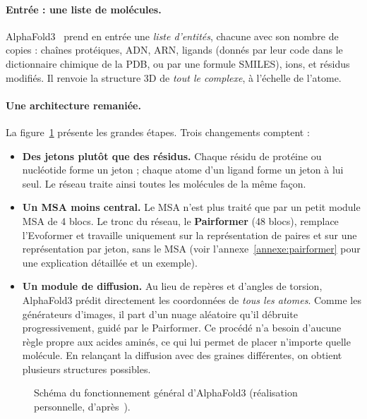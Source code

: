 \paragraph{Entrée : une liste de molécules.} AlphaFold3~\cite{abramson2024} prend en entrée une \emph{liste d'entités}, chacune avec son nombre de copies : chaînes protéiques, ADN, ARN, ligands (donnés par leur code dans le dictionnaire chimique de la PDB, ou par une formule SMILES), ions, et résidus modifiés. Il renvoie la structure 3D de \emph{tout le complexe}, à l'échelle de l'atome.

\paragraph{Une architecture remaniée.} La figure~\ref{fig:schema_af3} présente les grandes étapes. Trois changements comptent :
\begin{itemize}
  \item \textbf{Des jetons plutôt que des résidus.} Chaque résidu de protéine ou nucléotide forme un jeton ; chaque atome d'un ligand forme un jeton à lui seul. Le réseau traite ainsi toutes les molécules de la même façon.
  \item \textbf{Un MSA moins central.} Le MSA n'est plus traité que par un petit \og module MSA \fg{} de 4 blocs. Le tronc du réseau, le \textbf{Pairformer} (48 blocs), remplace l'Evoformer et travaille uniquement sur la représentation de paires et sur une représentation par jeton, sans le MSA (voir l'annexe~\ref{annexe:pairformer} pour une explication détaillée et un exemple).
  \item \textbf{Un module de diffusion.} Au lieu de repères et d'angles de torsion, AlphaFold3 prédit directement les coordonnées de \emph{tous les atomes}. Comme les générateurs d'images, il part d'un nuage aléatoire qu'il \og débruite \fg{} progressivement, guidé par le Pairformer. Ce procédé n'a besoin d'aucune règle propre aux acides aminés, ce qui lui permet de placer n'importe quelle molécule. En relançant la diffusion avec des graines différentes, on obtient plusieurs structures possibles.
\end{itemize}

\begin{figure}[H]
  \centering
  \resizebox{0.85\textwidth}{!}{}
  \caption{Schéma du fonctionnement général d'AlphaFold3 (réalisation personnelle, d'après~\cite{abramson2024}).}
  \label{fig:schema_af3}
\end{figure}


